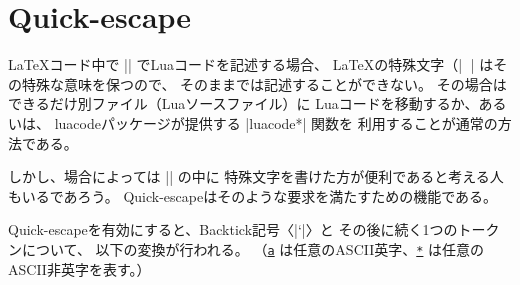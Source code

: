 \documentclass[a4paper]{ltjsarticle}
\newcommand{\Pkg}[1]{\textsf{#1}}
\newcommand{\Expl}{\par\noindent 例：\ }
\begin{document}
\section{Quick-escape}
\label{sec:quick}
\newcommand*{\XOth}{\underline{\texttt{*}}}
\newcommand*{\XLtr}{\underline{\texttt{a}}}

{\LaTeX}コード中で |\directlua| でLuaコードを記述する場合、
{\LaTeX}の特殊文字（|\| や |%
はその特殊な意味を保つので、
そのままでは記述することができない。
その場合はできるだけ別ファイル（Luaソースファイル）に
Luaコードを移動するか、あるいは、
\Pkg{luacode}パッケージが提供する |luacode*| 関数を
利用することが通常の方法である。

しかし、場合によっては |\directlua| の中に
特殊文字を書けた方が便利であると考える人もいるであろう。
Quick-escapeはそのような要求を満たすための機能である。

Quick-escapeを有効にすると、Backtick記号〈|`|〉と
その後に続く1つのトークンについて、
以下の変換が行われる。
（{\XLtr} は任意のASCII英字、{\XOth} は任意のASCII非英字を表す。）
\end{document}
